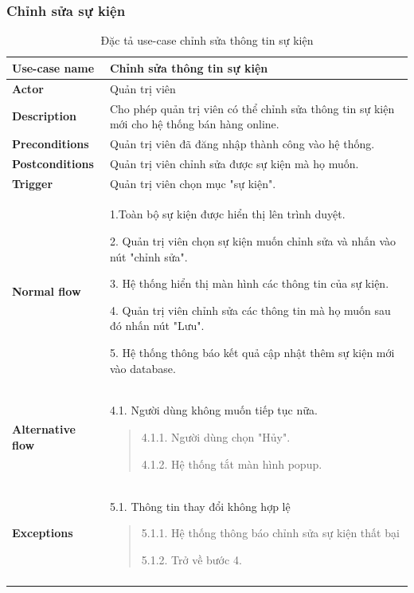 \subsubsection{Chỉnh sửa sự kiện}
{
    \setlength\extrarowheight{6pt}
    \begin{longtable}{| p{} | p{} |}
        \hline
        \textbf{Use-case name}
         &
        Chỉnh sửa thông tin sự kiện
        \\
        \hline
        \textbf{Actor}
         &
        Quản trị viên
        \\
        \hline
        \textbf{Description}
         &
        Cho phép quản trị viên có thể chỉnh sửa thông tin sự kiện mới cho hệ thống bán hàng online.
        \\
        \hline
        \textbf{Preconditions}
         &
        Quản trị viên đã đăng nhập thành công vào hệ thống.
        \\
        \hline
        \textbf{Postconditions}
         &
        Quản trị viên chỉnh sửa được sự kiện mà họ muốn.
        \\
        \hline
        \textbf{Trigger}
         &
        Quản trị viên chọn mục "sự kiện".
        \\
        \hline
        \begin{flushleft}
            \textbf{Normal flow}
        \end{flushleft}
         &
        1.Toàn bộ sự kiện được hiển thị lên trình duyệt.

        2. Quản trị viên chọn sự kiện muốn chỉnh sửa và nhấn vào nút "chỉnh sửa".

        3. Hệ thống hiển thị màn hình các thông tin của sự kiện.

        4. Quản trị viên chỉnh sửa các thông tin mà họ muốn sau đó nhấn nút "Lưu".

        5. Hệ thống thông báo kết quả cập nhật thêm sự kiện mới vào database.
        \\
        \hline
        \begin{flushleft}
            \textbf{Alternative flow}
        \end{flushleft}
         &
        4.1. Người dùng không muốn tiếp tục nữa.
        \begin{quote}
            4.1.1. Người dùng chọn "Hủy".

            4.1.2. Hệ thống tắt màn hình popup.
        \end{quote}
        \\
        \hline
        \begin{flushleft}
            \textbf{Exceptions}
        \end{flushleft}
         &
        5.1. Thông tin thay đổi không hợp lệ
        \begin{quote}
            5.1.1. Hệ thống thông báo chỉnh sửa sự kiện thất bại

            5.1.2. Trở về bước 4.
        \end{quote}
        \\
        \hline
        \caption{Đặc tả use-case chỉnh sửa thông tin sự kiện}
    \end{longtable}
}

